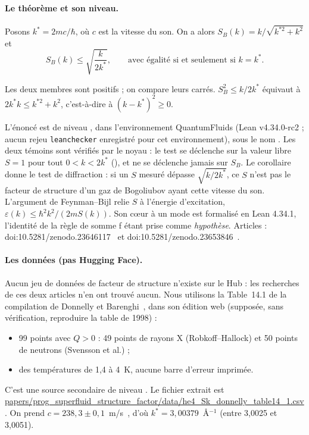\paragraph{Le théorème et son niveau.} Posons $k^*=2mc/\hbar$, où $c$ est la vitesse du son. On a alors
$S_B(k)=k/\sqrt{k^{*2}+k^2}$ et
\[S_B(k)\le\sqrt{\frac{k}{2k^*}},\qquad\text{avec égalité si et seulement si }k=k^* .\]
\begin{humanproof}
Les deux membres sont positifs ; on compare leurs carrés. $S_B^2\le k/2k^*$ équivaut à
$2k^*k\le k^{*2}+k^2$, c'est-à-dire à $(k-k^*)^2\ge0$.
\end{humanproof}
L'énoncé est de niveau \tierAs{}, dans l'environnement QuantumFluids (Lean v4.34.0-rc2 ; aucun rejeu \texttt{leanchecker} enregistré pour cet environnement), sous le nom
. Les deux témoins sont vérifiés par le noyau : le test se déclenche sur la valeur libre $S=1$
pour tout $0<k<2k^*$ (), et ne se déclenche jamais sur $S_B$. Le corollaire
 donne le \og test de diffraction \fg{} : si un $S$ mesuré dépasse
$\sqrt{k/2k^*}$, ce $S$ n'est pas le facteur de structure d'un gaz de Bogoliubov ayant cette vitesse du son.
L'argument de Feynman--Bijl relie $S$ à l'énergie d'excitation, $\varepsilon(k)\le\hbar^2k^2/(2mS(k))$. Son
c\oe ur à un mode est formalisé en Lean 4.34.1, l'identité de la règle de somme f étant prise comme
\emph{hypothèse}. Articles : doi:10.5281/zenodo.23646117~\cite{ch3-bsk} et
doi:10.5281/zenodo.23653846~\cite{ch3-fb}.

\paragraph{Les données (pas Hugging Face).} Aucun jeu de données de facteur de structure n'existe sur le Hub : les
recherches de ces deux articles n'en ont trouvé aucun. Nous utilisons la Table~14.1 de la compilation de Donnelly et
Barenghi~\cite{ch3-db}, dans son édition web (supposée, sans vérification, reproduire la table de 1998) :
\begin{itemize}
\item 99 points avec $Q>0$ : 49 points de rayons X (Robkoff--Hallock) et 50 points de neutrons (Svensson et al.) ;
\item des températures de 1,4 à 4~K, aucune barre d'erreur imprimée.
\end{itemize}
C'est une source secondaire de niveau \tierL{}. Le fichier extrait est
\url{papers/prog_superfluid_structure_factor/data/he4_Sk_donnelly_table14_1.csv}. On prend
$c=238{,}3\pm0{,}1$~m/s~\cite{ch3-godfrin}, d'où $k^*=3{,}00379$~\AA$^{-1}$ (entre 3,0025 et 3,0051).

